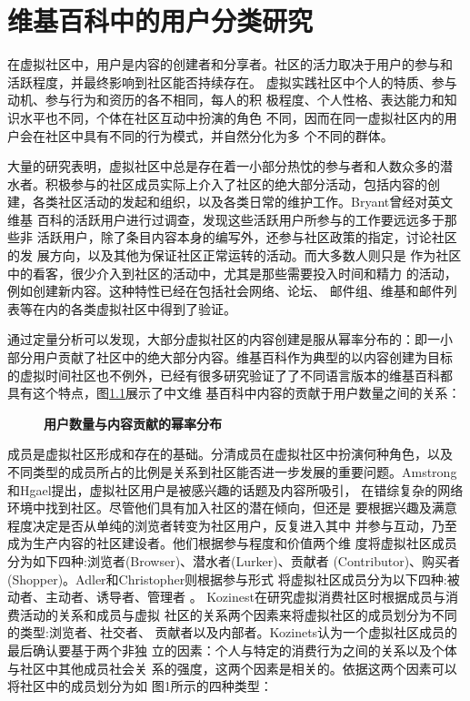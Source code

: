 
\chapter{维基百科中的用户分类研究}
\label{cha:user-category}

在虚拟社区中，用户是内容的创建者和分享者。社区的活力取决于用户的参与和
活跃程度，并最终影响到社区能否持续存在。
虚拟实践社区中个人的特质、参与动机、参与行为和资历的各不相同，每人的积
极程度、个人性格、表达能力和知识水平也不同，个体在社区互动中扮演的角色
不同，因而在同一虚拟社区内的用户会在社区中具有不同的行为模式，并自然分化为多
个不同的群体。

大量的研究表明，虚拟社区中总是存在着一小部分热忱的参与者和人数众多的潜
水者。积极参与的社区成员实际上介入了社区的绝大部分活动，包括内容的创
建，各类社区活动的发起和组织，以及各类日常的维护工作。Bryant曾经对英文维基
百科的活跃用户进行过调查，发现这些活跃用户所参与的工作要远远多于那些非
活跃用户，除了条目内容本身的编写外，还参与社区政策的指定，讨论社区的发
展方向，以及其他为保证社区正常运转的活动\cite{1099205}。而大多数人则只是
作为社区中的看客，很少介入到社区的活动中，尤其是那些需要投入时间和精力
的活动，例如创建新内容。这种特性已经在包括社会网络、论坛、
邮件组、维基和邮件列表等在内的各类虚拟社区中得到了验证。

通过定量分析可以发现，大部分虚拟社区的内容创建是服从幂率分布的：即一小
部分用户贡献了社区中的绝大部分内容。维基百科作为典型的以内容创建为目标
的虚拟时间社区也不例外，已经有很多研究验证了了不同语言版本的维基百科都
具有这个特点，图\ref{fig:power-law}展示了中文维
基百科中内容的贡献于用户数量之间的关系：

\begin{figure}
  \centering
 \scalebox{0.4}{ \texttt{[image: 02-3]}}
  \caption{\small{\bf{用户数量与内容贡献的幂率分布}}}
  \label{fig:power-law}
\end{figure}

成员是虚拟社区形成和存在的基础。分清成员在虚拟社区中扮演何种角色，以及
不同类型的成员所占的比例是关系到社区能否进一步发展的重要问题。Amstrong和Hgael提出，虚拟社区用户是被感兴趣的话题及内容所吸引，
在错综复杂的网络环境中找到社区。尽管他们具有加入社区的潜在倾向，但还是
要根据兴趣及满意程度决定是否从单纯的浏览者转变为社区用户，反复进入其中
并参与互动，乃至成为生产内容的社区建设者\cite{hagel1997net}。他们根据参与程度和价值两个维
度将虚拟社区成员分为如下四种:浏览者(Browser)、潜水者(Lurker)、贡献者
(Contributor)、购买者(Shopper)。Adler和Christopher则根据参与形式
将虚拟社区成员分为以下四种:被动者、主动者、诱导者、管理者
\cite{adler1999icp}。
Kozinest在研究虚拟消费社区时根据成员与消费活动的关系和成员与虚拟
社区的关系两个因素来将虚拟社区的成员划分为不同的类型:浏览者、社交者、
贡献者以及内部者。Kozinets认为一个虚拟社区成员的最后确认要基于两个非独
立的因素：个人与特定的消费行为之间的关系以及个体与社区中其他成员社会关
系的强度，这两个因素是相关的。依据这两个因素可以将社区中的成员划分为如
图1所示的四种类型\cite{kozinets2002field}：

